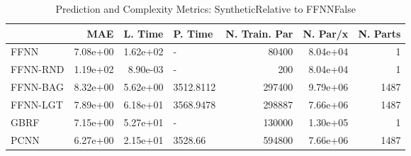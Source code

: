 \begin{table}
\centering
\caption{Prediction and Complexity Metrics: SyntheticRelative to FFNNFalse}
\label{tab__Synthetic__Fix_Neurons_QTrue}
\begin{tabular}{lrrlrrr}
\toprule
{} &      MAE &  L. Time &    P. Time &  N. Train. Par &  N. Par/x &  N. Parts \\
\midrule
FFNN     & 7.08e+00 & 1.62e+02 &          - &          80400 &  8.04e+04 &         1 \\
FFNN-RND & 1.19e+02 & 8.90e-03 &          - &            200 &  8.04e+04 &         1 \\
FFNN-BAG & 8.32e+00 & 5.62e+00 &  3512.8112 &         297400 &  9.79e+06 &      1487 \\
FFNN-LGT & 7.89e+00 & 6.18e+01 &  3568.9478 &         298887 &  7.66e+06 &      1487 \\
GBRF     & 7.15e+00 & 5.27e+01 &          - &         130000 &  1.30e+05 &         1 \\
PCNN     & 6.27e+00 & 2.15e+01 &    3528.66 &         594800 &  7.66e+06 &      1487 \\
\bottomrule
\end{tabular}
\end{table}
